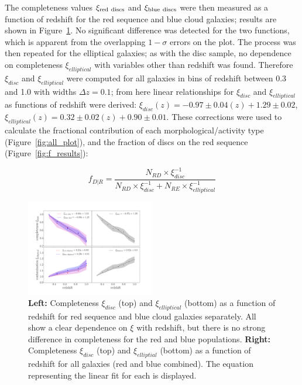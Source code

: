 \documentclass[useAMS,usenatbib]{mn2e}
\begin{document}
The completeness values $\rm \xi_{red~discs}$ and $\rm \xi_{blue~discs}$ were then measured as a function of redshift for the red sequence and blue cloud  galaxies; results are shown in Figure~\ref{fig:xi}. No significant difference was detected for the two functions, which is apparent from the overlapping $1-\sigma$ errors on the plot. The process was then repeated for the elliptical galaxies; as with the disc sample, no dependence on completeness $\xi_{elliptical}$ with variables other than redshift was found. Therefore $\xi_{disc}$ and $\xi_{elliptical}$ were computed for all galaxies in bins of redshift between 0.3 and 1.0 with widths $\Delta z = 0.1$; from here linear relationships for $\xi_{disc}$ and $\xi_{elliptical}$ as functions of redshift were derived: $\xi_{disc}(z) = -0.97 \pm 0.04 (z) + 1.29 \pm 0.02$, $\xi_{elliptical}(z) = 0.32 \pm 0.02 (z) + 0.90 \pm 0.01$. These corrections were used to calculate the fractional contribution of each morphological/activity type (Figure~\ref{fig:all_plot}), and the fraction of discs on the red sequence (Figure~\ref{fig:f_results}):

\begin{equation}
f_{D|R}=\frac{N_{RD}\times \xi_{disc}^{-1}}{N_{RD}\times \xi_{disc}^{-1} + N_{RE}\times \xi_{elliptical}^{-1}}
\label{eqn:frid}
\end{equation}


\begin{figure}
\centering
\includegraphics[width=0.5\textwidth,trim={3cm 1.5cm 3cm 3cm},clip]{figures/completeness_full.pdf}
\caption{\textbf{Left:} Completeness $\xi_{disc}$ (top) and $\xi_{elliptical}$ (bottom) as a function of redshift for red sequence and blue cloud  galaxies separately. All show a clear dependence on $\xi$ with redshift, but there is no strong difference in completeness for the red and blue populations. \textbf{Right:} Completeness $\xi_{disc}$ (top) and $\xi_{elliptial}$ (bottom) as a function of redshift for all   galaxies (red and blue combined). The equation representing the linear fit for each is displayed.}
\label{fig:xi}
\end{figure}
\end{document}
